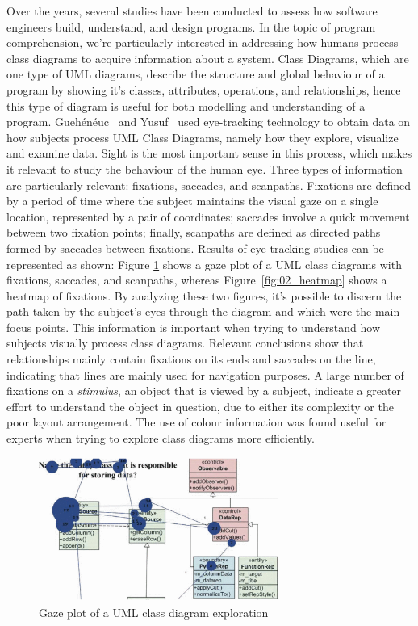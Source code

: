 Over the years, several studies have been conducted to assess how software engineers build, understand, and design programs. In the topic of program comprehension, we're particularly interested in addressing how humans process class diagrams to acquire information about a system. Class Diagrams, which are one type of UML diagrams, describe the structure and global behaviour of a program by showing it's classes, attributes, operations, and relationships, hence this type of diagram is useful for both modelling and understanding of a program.  
Guehénéuc~\cite{Gueheneuc2006} and Yusuf~\cite{Yusuf2007} used eye-tracking technology to obtain data on how subjects process UML Class Diagrams, namely how they explore, visualize and examine data. Sight is the most important sense in this process, which makes it relevant to study the behaviour of the human eye. Three types of information are particularly relevant: fixations, saccades, and scanpaths. Fixations are defined by a period of time where the subject maintains the visual gaze on a single location, represented by a pair of coordinates; saccades involve a quick movement between two fixation points; finally, scanpaths are defined as directed paths formed by saccades between fixations. Results of eye-tracking studies can be represented as shown: Figure \ref{fig:01_gazeplot} shows a gaze plot of a UML class diagrams with fixations, saccades, and scanpaths, whereas Figure~\ref{fig:02_heatmap} shows a heatmap of fixations. By analyzing these two figures, it's possible to discern the path taken by the subject's eyes through the diagram and which were the main focus points. This information is important when trying to understand how subjects visually process class diagrams. Relevant conclusions show that relationships mainly contain fixations on its ends and saccades on the line, indicating that lines are mainly used for navigation purposes. A large number of fixations on a \textit{stimulus}, an object that is viewed by a subject, indicate a greater effort to understand the object in question, due to either its complexity or the poor layout arrangement. The use of colour information was found useful for experts when trying to explore class diagrams more efficiently.


\begin{figure}[ht]
\centering
\includegraphics[width=0.7\textwidth]{Template/Chapters/figures/4_RelatedWork/01_GazePlot.png}
\caption{Gaze plot of a UML class diagram exploration~\cite{Yusuf2007}}
\label{fig:01_gazeplot}
\end{figure}

